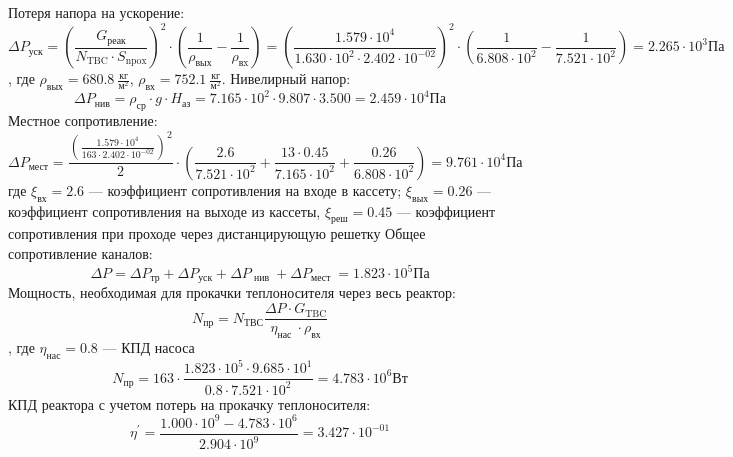 \noindent Потеря напора на ускорение:
\begin{equation}
\Delta P_{\mathrm{уск}} = \left( \frac{G_{\text{реак}}}{N_{\mathrm{TBC}} \cdot S_{\mathrm{npox}}} \right)^{2} \cdot \left(\frac{1}{\rho_{\mathrm{вых}}} - \frac{1}{\rho_{\mathrm{вx}}} \right)
=
\left( \frac{ 1.579 \cdot 10^{ 4 } } { 1.630 \cdot 10^{ 2 } \cdot 2.402 \cdot 10^{ -02 } } \right)^2 \cdot \left(\frac 1 { 6.808 \cdot 10^{ 2 } } - \frac 1  { 7.521 \cdot 10^{ 2 } } \right) =  2.265 \cdot 10^{ 3 } \text{Па}
\end{equation}, где $\rho_{\text{вых}} = 680.8\ \frac{\text{кг}}{\text{м}^2} $, $\rho_{\text{вх}} =752.1\  \frac {\text{кг}}{\text{м}^2}$.
\newline
\noindent Нивелирный напор:
$$
\Delta P_{\text{нив}} = \rho_{\text{ср}} \cdot g \cdot H_{\text{аз}}
=
7.165 \cdot 10^{ 2 } \cdot 9.807 \cdot 3.500  = 2.459 \cdot 10^{ 4 } \text{Па}
$$
Местное сопротивление:
$$
\Delta P_{\text{мест}} = \frac{ \left( \frac{1.579 \cdot 10^{ 4 }} {163 \cdot 2.402 \cdot 10^{ -02 } }  \right)^2 } {2} \cdot \left( \frac{ 2.6 }{ 7.521 \cdot 10^{ 2 } } +\frac{ 13 \cdot 0.45 }{7.165 \cdot 10^{ 2 }}+\frac{0.26} { 6.808 \cdot 10^{ 2 } } \right) = 9.761 \cdot 10^{ 4 } \text{Па}
$$
где $\xi_{\text{вх}}= 2.6 $ — коэффициент сопротивления на входе в кассету; $\xi_{\text{вых}} = 0.26$ — коэффициент сопротивления на выходе из кассеты, $\xi_{\text{реш}} = 0.45$ — коэффициент сопротивления при проходе через дистанцирующую решетку %
Общее сопротивление каналов:
$$
\Delta P=\Delta P_{\mathrm{тр}}+\Delta P_{\mathrm{уск}}+\Delta P_{\text { нив }}+\Delta P_{\text {мест }} = 1.823 \cdot 10^{ 5 } \text{Па} 
$$
Мощность, необходимая для прокачки теплоносителя через весь реактор:
$$
N_{\mathrm{пр}}=N_{\mathrm{ТВС}} \frac{\Delta P \cdot G_{\mathrm{TBC}}}{\eta_{\text {нас }} \cdot \rho_{\mathrm{вх}}}
$$, где $\eta_{\text{нас}}=0.8$ — КПД насоса
\[
    N_{\text{пр}} = 163 \cdot \frac {1.823 \cdot 10^{ 5 } \cdot 9.685 \cdot 10^{ 1 }} {0.8 \cdot 7.521 \cdot 10^{ 2 }} = 4.783 \cdot 10^{ 6 } \text{Вт}
\]
\noindent КПД реактора с учетом потерь на прокачку теплоносителя:
$$
\eta^{\prime} = \frac{1.000 \cdot 10^{ 9 } - 4.783 \cdot 10^{ 6 }}{2.904 \cdot 10^{ 9 }}={3.427 \cdot 10^{ -01 }}
$$
